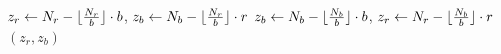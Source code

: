 \begin{algorithm}
\caption{: returns the non-saturated fairlet in a set with $(N_r, N_b)$ points.}\label{alg:non-saturated-fairlet}
\begin{algorithmic}[1]
		\STATE $z_r \leftarrow N_r - \lfloor {N_r \over b} \rfloor\cdot b$, $z_b \leftarrow N_b - \lfloor {N_r \over b} \rfloor\cdot r$
	\ELSE{} 
		\STATE $z_b \leftarrow N_b - \lfloor {N_b \over b} \rfloor\cdot b$, $z_r \leftarrow N_r - \lfloor {N_b \over b} \rfloor\cdot r$
	\ENDIF
	\RETURN $(z_r, z_b)$
\end{algorithmic}
\end{algorithm}

